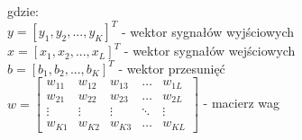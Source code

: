 \documentclass[a4paper, openright, twoside,11pt]{article}
\begin{document}
    gdzie:\\[0.3cm]
    $y = [y_1, y_2, ..., y_K]^T$  - wektor sygnałów wyjściowych \\[0.3cm]
    $x = [x_1,x_2,...,x_L]^T$ - wektor sygnałów wejściowych \\[0.3cm]
    $b = [b_1,b_2, ..., b_K]^T$ - wektor przesunięć \\[0.3cm]
    $w=\begin{bmatrix}
    w_{11} & w_{12} & w_{13} & \dots  & w_{1L} \\
    w_{21} & w_{22} & w_{23} & \dots  & w_{2L} \\
    \vdots & \vdots & \vdots & \ddots & \vdots \\
    w_{K1} & w_{K2} & w_{K3} & \dots  & w_{KL}
    \end{bmatrix}$ - macierz wag
    
    \clearpage
\end{document}

